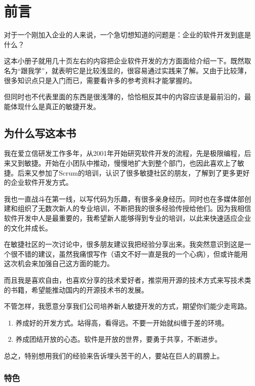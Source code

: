 \chapter{前言}
\label{前言}

对于一个刚加入企业的人来说，一个急切想知道的问题是：企业的软件开发到底是什么？

这本小册子就用几十页左右的内容把企业软件开发的方方面面给介绍一下。既然取名为“跟我学”，就表明它是比较浅显的，很容易通过实践来了解。又由于比较薄，很多知识点只是入门而已，需要看许多的参考资料才能掌握的。

但同时也不代表里面的东西是很浅薄的，恰恰相反其中的内容应该是最前沿的，最能体现什么是真正的敏捷开发。

\section{为什么写这本书}
\label{为什么写这本书}

我在爱立信研发工作多年，从2001年开始研究软件开发的流程，先是极限编程，后来又到敏捷。开始在小团队中推动，慢慢地扩大到整个部门，也因此喜欢上了敏捷。后来又参加了Scrum的培训，认识了很多敏捷社区的朋友，了解到了更多更好的企业软件开发方式。

我也一直战斗在第一线，以写代码为乐趣，有很多亲身经历。同时也在多媒体部创建和组织了无数次新人的专业培训，不断把我的很多经验传授给他们。因为我相信软件开发中人是最重要的，我希望新人能够得到专业的培训，以此来快速适应企业的文化并成长。

在敏捷社区的一次讨论中，很多朋友建议我把经验分享出来。我突然意识到这是一个很不错的建议，虽然我痛恨写作（语文不好一直是我的一个心病），但或许能用这次机会来加强自己这方面的能力。

而且我是喜欢自由，也喜欢分享的技术爱好者，推崇用开源的技术方式来写技术类的书籍，希望能推动国内的开源技术书的发展。

不管怎样，我愿意分享我们公司培养新人敏捷开发的方式，期望你们能少走弯路。

\begin{enumerate}
\item 养成好的开发方式。站得高，看得远。不要一开始就纠缠于差的环境。

\item 养成团结开放的心态。软件是开放的世界，要勇于共享，不断进步。

\end{enumerate}

总之，特别想用我们的经验来告诉埋头苦干的人，要站在巨人的肩膀上。

\subsection{特色}
\label{特色}

